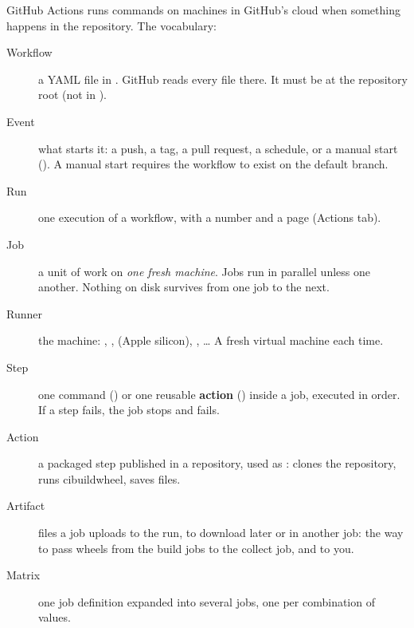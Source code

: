 GitHub Actions runs commands on machines in GitHub's cloud when something happens in the
repository. The vocabulary:
\begin{description}
  \item[Workflow] a YAML file in . GitHub reads every file there. It must be
        at the repository root (not in ).
  \item[Event] what starts it: a push, a tag, a pull request, a schedule, or a manual start
        (). A manual start requires the workflow to exist on the default
        branch.
  \item[Run] one execution of a workflow, with a number and a page (Actions tab).
  \item[Job] a unit of work on \emph{one fresh machine}. Jobs run in parallel unless one
         another. Nothing on disk survives from one job to the next.
  \item[Runner] the machine: , ,  (Apple
        silicon), , \dots{} A fresh virtual machine each time.
  \item[Step] one command () or one reusable \textbf{action} () inside a job,
        executed in order. If a step fails, the job stops and fails.
  \item[Action] a packaged step published in a repository, used as :
         clones the repository,  runs
        cibuildwheel,  saves files.
  \item[Artifact] files a job uploads to the run, to download later or in another job: the way to
        pass wheels from the build jobs to the collect job, and to you.
  \item[Matrix] one job definition expanded into several jobs, one per combination of values.
\end{description}

